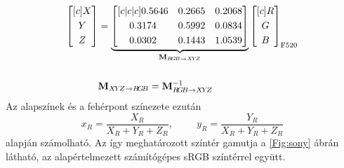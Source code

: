 \begin{align}
\begin{split}
\begin{bmatrix}[c]
       X \\[0.3em]
       Y \\[0.3em]
       Z \end{bmatrix} &= 
     \underbrace{ \begin{bmatrix}[c|c|c]
       0.5646 &  0.2665 &  0.2068 \\[0.3em]
       0.3174 &  0.5992 &  0.0834 \\[0.3em]
       0.0302 &  0.1443 &  1.0539 \end{bmatrix} }_{\mathbf{M}_{R\!G\!B \rightarrow X\!Y\!Z}}
\begin{bmatrix}[c]
       R \\[0.3em]
       G \\[0.3em]
       B \end{bmatrix}_{\mathrm{F}520}
\\ \vspace{1mm} \\
&\mathbf{M}_{X\!Y\!Z \rightarrow   R\!G\!B} = \mathbf{M}_{R\!G\!B \rightarrow X\!Y\!Z}^{-1}
\end{split}
\end{align}
Az alapszínek és a fehérpont színezete ezután
\begin{equation}
x_R = \frac{X_R}{X_R + Y_R + Z_R}, \hspace{1cm} y_R = \frac{Y_R}{X_R + Y_R + Z_R}
\end{equation}
alapján számolható.
Az így meghatározott színtér gamutja a \ref{Fig:sony} ábrán látható, az alapértelmezett számítógépes sRGB színtérrel együtt.

